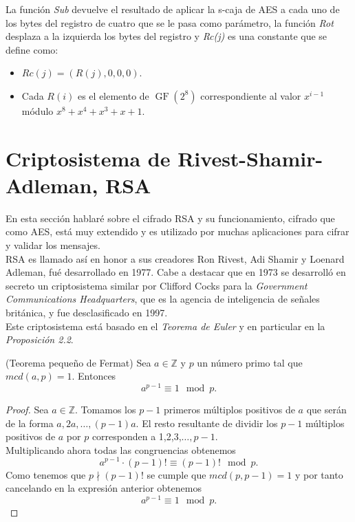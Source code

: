 La función \emph{Sub} devuelve el resultado de aplicar la s-caja de AES a cada uno de los bytes del registro de cuatro que se le pasa como parámetro, la función \emph{Rot} desplaza a la izquierda los bytes del registro y \emph{Rc(j)} es una constante que se define como:
\begin{itemize}
	\item $Rc(j)=(R(j),0,0,0)$.
	\item Cada $R(i)$ es el elemento de $\operatorname{GF}(2^8)$ correspondiente al valor $x^{i-1}$ módulo $x^8+x^4+x^3+x+1$.
\end{itemize}

\section{Criptosistema de Rivest-Shamir-Adleman, RSA}
En esta sección hablaré sobre el cifrado RSA y su funcionamiento, cifrado que como AES, está muy extendido y es utilizado por muchas aplicaciones para cifrar y validar los mensajes.\\
RSA es llamado así en honor a sus creadores Ron Rivest, Adi Shamir y Loenard Adleman, fué desarrollado en 1977. Cabe a destacar que en 1973 se desarrolló en secreto un criptosistema similar por Clifford Cocks para la \emph{Government Communications Headquarters}, que es la agencia de inteligencia de señales británica, y fue desclasificado en 1997\cite{cliffordCocks}.\\
Este criptosistema está basado en el \emph{Teorema de Euler} y en particular en la \emph{Proposición 2.2}.\\

\begin{teorema}
	(Teorema pequeño de Fermat) Sea $a \in \mathbb{Z}$ y $p$ un número primo tal que $mcd(a,p)=1$. Entonces
	$$
		a^{p-1} \equiv 1 \mod p.
	$$
\end{teorema}\vspace*{-10mm}
\begin{proof}
		Sea $a \in \mathbb{Z}$. Tomamos los $p-1$ primeros múltiplos positivos de $a$ que serán de la forma $a, 2a,\dots,(p-1)a$. El resto resultante de dividir los $p-1$ múltiplos positivos de $a$ por $p$ corresponden a 1,2,3,$\dots,p-1$.\\
	Multiplicando ahora todas las congruencias obtenemos 
	$$
		a^{p-1}·(p-1)! \equiv (p-1)! \mod p.
	$$
	Como tenemos que $p\nmid (p-1)!$ se cumple que $mcd(p,p-1)=1$ y por tanto cancelando en la expresión anterior obtenemos
	$$
		a^{p-1} \equiv 1 \mod p.
	$$
\end{proof}


